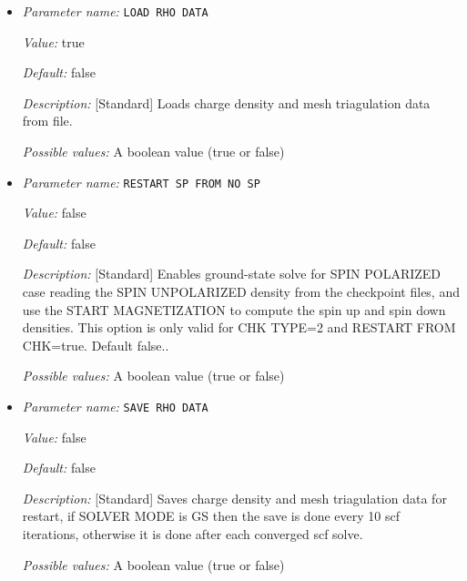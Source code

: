\begin{itemize}
\item {\it Parameter name:} {\tt LOAD RHO DATA}
\label{parameters:SCF Checkpointing and Restart/LOAD RHO DATA}
\label{parameters:SCF_20Checkpointing_20and_20Restart/LOAD_20RHO_20DATA}


{\it Value:} true


{\it Default:} false


{\it Description:} [Standard] Loads charge density and mesh triagulation data from file.


{\it Possible values:} A boolean value (true or false)
\item {\it Parameter name:} {\tt RESTART SP FROM NO SP}
\label{parameters:SCF Checkpointing and Restart/RESTART SP FROM NO SP}
\label{parameters:SCF_20Checkpointing_20and_20Restart/RESTART_20SP_20FROM_20NO_20SP}


{\it Value:} false


{\it Default:} false


{\it Description:} [Standard] Enables ground-state solve for SPIN POLARIZED case reading the SPIN UNPOLARIZED density from the checkpoint files, and use the START MAGNETIZATION to compute the spin up and spin down densities. This option is only valid for CHK TYPE=2 and RESTART FROM CHK=true. Default false..


{\it Possible values:} A boolean value (true or false)
\item {\it Parameter name:} {\tt SAVE RHO DATA}
\label{parameters:SCF Checkpointing and Restart/SAVE RHO DATA}
\label{parameters:SCF_20Checkpointing_20and_20Restart/SAVE_20RHO_20DATA}


{\it Value:} false


{\it Default:} false


{\it Description:} [Standard] Saves charge density and mesh triagulation data for restart, if SOLVER MODE is GS then the save is done every 10 scf iterations, otherwise it is done after each converged scf solve.


{\it Possible values:} A boolean value (true or false)
\end{itemize}

